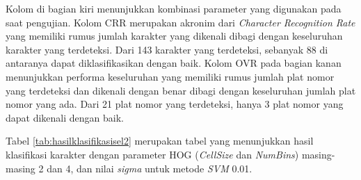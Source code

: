 \noindent Kolom di bagian kiri menunjukkan kombinasi parameter yang digunakan pada saat pengujian. Kolom CRR merupakan akronim dari \textit{Character Recognition Rate} yang memiliki rumus jumlah karakter yang dikenali dibagi dengan keseluruhan karakter yang terdeteksi. Dari 143 karakter yang terdeteksi, sebanyak 88 di antaranya dapat diklasifikasikan dengan baik. Kolom OVR pada bagian kanan menunjukkan performa keseluruhan yang memiliki rumus jumlah plat nomor yang terdeteksi dan dikenali dengan benar dibagi dengan keseluruhan jumlah plat nomor yang ada. Dari 21 plat nomor yang terdeteksi, hanya 3 plat nomor yang dapat dikenali dengan baik. 

\noindent Tabel \ref{tab:hasilklasifikasisel2} merupakan tabel yang menunjukkan hasil klasifikasi karakter dengan parameter HOG (\textit{CellSize} dan \textit{NumBins}) masing-masing 2 dan 4, dan nilai \textit{sigma} untuk metode \textit{SVM} 0.01.

